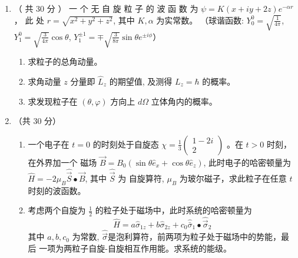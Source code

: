 \begin{enumerate}
\banswer{
	
}


\item 
（ 共 30 分 ） 一 个 无 自 旋 粒 子 的 波 函 数 为
$\psi=K(x+i y+2 z) e^{-\alpha r} $， 此 处
$r=\sqrt{x^{2}+y^{2}+z^{2}}$, 其中 $K, \alpha$ 为实常数。  （球谐函数: $Y_{0}^{0}=\sqrt{\frac{1}{4 \pi}}$, $ Y_{1}^{0}=\sqrt{\frac{3}{4 \pi}} \cos \theta$, 
$Y_{1}^{\pm 1}=\mp \sqrt{\frac{3}{8 \pi}} \sin \theta e^{\pm i \phi} $）
\begin{enumerate}
	\item
	求粒子的总角动量。
	\item 
	求角动量 $z$ 分量即 $\hat{L}_{z}$ 的期望值, 及测得 $L_{z}=\hbar$ 的概率。
	\item 
	求发现粒子在 $(\theta, \varphi)$ 方向上 $d \Omega$ 立体角内的概率。
	
	
	
\end{enumerate}

\banswer{
	
}


\newpage
\item 
（共 30 分）
\begin{enumerate}
	\item
	一个电子在 $t=0$ 的时刻处于自旋态 $\chi=\frac{1}{3}\left(\begin{array}{c}1-2 i \\ 2\end{array}\right)$ 。在 $t>0$ 时刻，在外界加一个
	磁场 $\vec{B}=B_{0}\left(\sin \theta \hat{e}_{x}+\cos \theta \hat{e}_{z}\right)$, 此时电子的哈密顿量为 $\hat{H}=-2 \mu_{B} \hat{\vec{S}} \bullet \vec{B}$, 其中 $\hat{\vec{S}}$ 为 自旋算符, $\mu_{B}$ 为玻尔磁子，求此粒子在任意 $t$ 时刻的波函数。
	\item 
	考虑两个自旋为 $\frac{1}{2}$ 的粒子处于磁场中，此时系统的哈密顿量为
	\[ \hat{H}=a \hat{\sigma}_{1 z}+b \hat{\sigma}_{2 z}+c_{0} \hat{\bar{\sigma}}_{1} \bullet \hat{\vec{\sigma}}_{2} \]
	其中 $a, b, c_{0}$ 为常数, $\hat{\vec{\sigma}}$是泡利算符，前两项为粒子处于磁场中的势能，最后
	一项为两粒子自旋-自旋相互作用能。求系统的能级。
\end{enumerate}



\end{enumerate}
